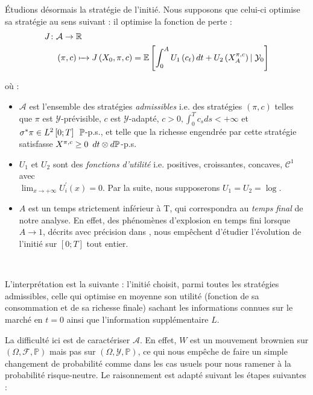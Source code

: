 \documentclass[../finalreport.tex]{subfiles}
\begin{document}
\par Étudions désormais la stratégie de l'initié. Nous supposons que celui-ci optimise sa stratégie au sens suivant : il optimise la fonction de perte :
\begin{align*}
      J \colon &\mathcal{A} \to \mathbb{R} \\
       &\left( \pi, c \right) \xmapsto{\phantom{\mathcal{A}}} J \left( X_0, \pi, c \right) = \mathbb{E} \left[ \int_0^A U_1 \left( c_t \right) dt + U_2 \left( X_A^{\pi, c} \right) \left\vert\right. \mathcal{Y}_0 \right]
\end{align*}

où : 
\begin{itemize}
\item $\mathcal{A}$ est l'ensemble des stratégies \emph{admissibles} i.e. des stratégies $\left( \pi, c \right)$ telles que $\pi$ est $\mathcal{Y}$-prévisible, $c$ est $\mathcal{Y}$-adapté, $c >0, \int_0^T c_s ds < + \infty$ et $\sigma^* \pi \in L^2 \left[ 0; T \right] \enskip \mathbb{P}$-p.s., et telle que la richesse engendrée par cette stratégie satisfasse $X^{\pi, c} \geq 0 \enskip dt \otimes d \mathbb{P}$-p.s.
\item $U_1$ et $U_2$ sont des \emph{fonctions d'utilité} i.e. positives, croissantes, concaves, $\mathcal{C}^1$ avec \\ $\lim_{x \to +\infty} U_i^{'} \left( x \right) = 0$. Par la suite, nous supposerons $U_1 = U_2 = \log$.
\item $A$ est un temps strictement inférieur à T, qui correspondra au \emph{temps final} de notre analyse. En effet, des phénomènes d'explosion en temps fini lorsque $A \to 1$, décrits avec précision dans \cite{art3}, nous empêchent d'étudier l'évolution de l'initié sur $\left[ 0; T \right]$ tout entier. 
\end{itemize}
\

\par L'interprétation est la suivante : l'initié choisit, parmi toutes les stratégies admissibles, celle qui optimise en moyenne son utilité (fonction de sa consommation et de sa richesse finale) sachant les informations connues sur le marché en $t = 0$ ainsi que l'information supplémentaire $L$.\\

\par La difficulté ici est de caractériser $\mathcal{A}$. En effet, $W$ est un mouvement brownien sur $\left(\Omega, \mathcal{F}, \mathbb{P} \right) $ mais pas sur $\left(\Omega, \mathcal{Y}, \mathbb{P} \right)$, ce qui nous empêche de faire un simple changement de probabilité comme dans les cas usuels pour nous ramener à la probabilité risque-neutre. Le raisonnement est adapté suivant les étapes suivantes :
\end{document}

